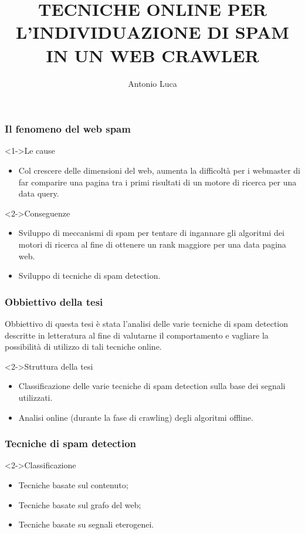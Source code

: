 \documentclass{beamer}
\title[Tesi di Laurea]{TECNICHE ONLINE PER L’INDIVIDUAZIONE DI SPAM IN UN WEB CRAWLER}
\institute{Università degli Studi di Milano}
\author{Antonio Luca}
\begin{document}
\begin{frame}
  \maketitle
\end{frame}
\begin{frame}
    \frametitle{Il fenomeno del web spam}
    \begin{block}<1->{Le cause}
    \begin{itemize}
    \item<1->Col crescere delle dimensioni del web, aumenta la difficoltà per i webmaster di far comparire una pagina tra i primi risultati di un motore di ricerca per una data query.
    \end{itemize}
    \end{block}
    \begin{block}<2->{Conseguenze}
    \begin{itemize}
        \item<1->Sviluppo di meccanismi di spam per tentare di ingannare gli algoritmi dei motori di ricerca al fine di ottenere un rank maggiore per una data pagina web. 
        \item<2->Sviluppo di tecniche di spam detection.
    \end{itemize}
    \end{block}
\end{frame}
\begin{frame}
  \frametitle{Obbiettivo della tesi}  
  Obbiettivo di questa tesi è stata l’analisi delle varie tecniche di spam detection descritte in letteratura al fine di valutarne il comportamento e vagliare la possibilità di utilizzo di tali tecniche online.
  \begin{block}<2->{Struttura della tesi}
  \begin{itemize}
  \item Classificazione delle varie tecniche di spam detection sulla base dei segnali utilizzati.
  \item Analisi online (durante la fase di crawling) degli algoritmi offline.
  \end{itemize}
  \end{block}
\end{frame}
 \begin{frame}
     \frametitle{Tecniche di spam detection}
     \begin{block}<2->{Classificazione}
     \begin{itemize}
     \item<3->Tecniche basate sul contenuto;	
     \item<4->Tecniche basate sul grafo del web;
     \item<5->Tecniche basate su segnali eterogenei.
     \end{itemize}
     \end{block}
 \end{frame}
\end{document}
